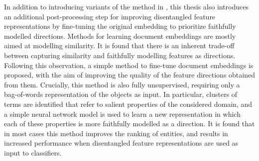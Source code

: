\documentclass[a4paper,oneside,onecolumn,openright,12pt]{book}
\begin{document}

 In addition to introducing variants of the method in \cite{Derrac2015}, this thesis also introduces an additional post-processing step for improving disentangled feature representations by fine-tuning the original embedding to prioritize faithfully modelled directions. Methods for learning document embeddings  are mostly aimed at modelling similarity. It is found  that there is an inherent trade-off between capturing similarity and faithfully modelling features as directions. Following this observation, a simple method to fine-tune  document embeddings is proposed, with the aim of improving the quality of the feature directions obtained from them. Crucially, this  method is also fully unsupervised, requiring only a bag-of-words representation of the objects as input.  In particular,  clusters of terms are identified that refer to salient properties of the considered domain, and a simple neural network model is used to learn a new representation in which each of these properties is more faithfully modelled as a direction. It is found that in most cases this method improves the ranking of entities, and results in increased performance when disentangled feature representations are used as input to classifiers. %






\end{document}
